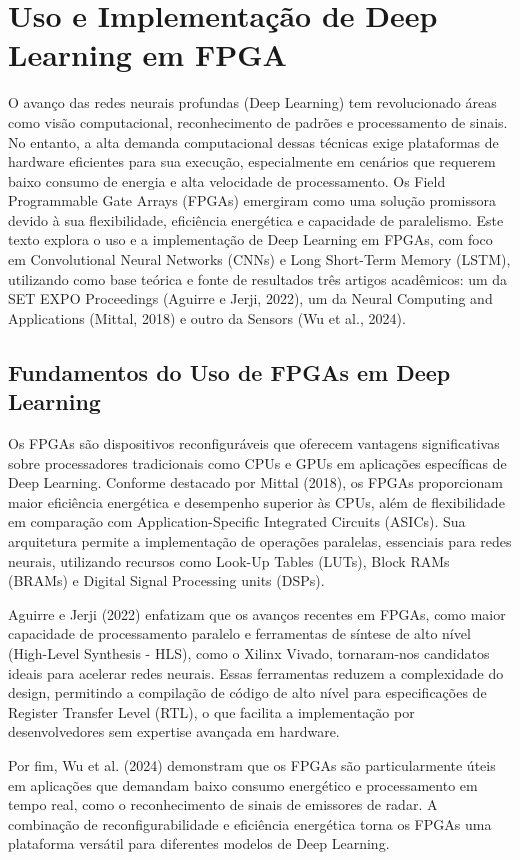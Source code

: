 \chapter{Uso e Implementação de Deep Learning em FPGA}

O avanço das redes neurais profundas (Deep Learning) tem revolucionado áreas como visão computacional, reconhecimento de padrões e processamento de sinais. No entanto, a alta demanda computacional dessas técnicas exige plataformas de hardware eficientes para sua execução, especialmente em cenários que requerem baixo consumo de energia e alta velocidade de processamento. Os Field Programmable Gate Arrays (FPGAs) emergiram como uma solução promissora devido à sua flexibilidade, eficiência energética e capacidade de paralelismo. Este texto explora o uso e a implementação de Deep Learning em FPGAs, com foco em Convolutional Neural Networks (CNNs) e Long Short-Term Memory (LSTM), utilizando como base teórica e fonte de resultados três artigos acadêmicos: um da SET EXPO Proceedings (Aguirre e Jerji, 2022), um da Neural Computing and Applications (Mittal, 2018) e outro da Sensors (Wu et al., 2024).

\section{Fundamentos do Uso de FPGAs em Deep Learning}
Os FPGAs são dispositivos reconfiguráveis que oferecem vantagens significativas sobre processadores tradicionais como CPUs e GPUs em aplicações específicas de Deep Learning. Conforme destacado por Mittal (2018), os FPGAs proporcionam maior eficiência energética e desempenho superior às CPUs, além de flexibilidade em comparação com Application-Specific Integrated Circuits (ASICs). Sua arquitetura permite a implementação de operações paralelas, essenciais para redes neurais, utilizando recursos como Look-Up Tables (LUTs), Block RAMs (BRAMs) e Digital Signal Processing units (DSPs).

Aguirre e Jerji (2022) enfatizam que os avanços recentes em FPGAs, como maior capacidade de processamento paralelo e ferramentas de síntese de alto nível (High-Level Synthesis - HLS), como o Xilinx Vivado, tornaram-nos candidatos ideais para acelerar redes neurais. Essas ferramentas reduzem a complexidade do design, permitindo a compilação de código de alto nível para especificações de Register Transfer Level (RTL), o que facilita a implementação por desenvolvedores sem expertise avançada em hardware.

Por fim, Wu et al. (2024) demonstram que os FPGAs são particularmente úteis em aplicações que demandam baixo consumo energético e processamento em tempo real, como o reconhecimento de sinais de emissores de radar. A combinação de reconfigurabilidade e eficiência energética torna os FPGAs uma plataforma versátil para diferentes modelos de Deep Learning.

